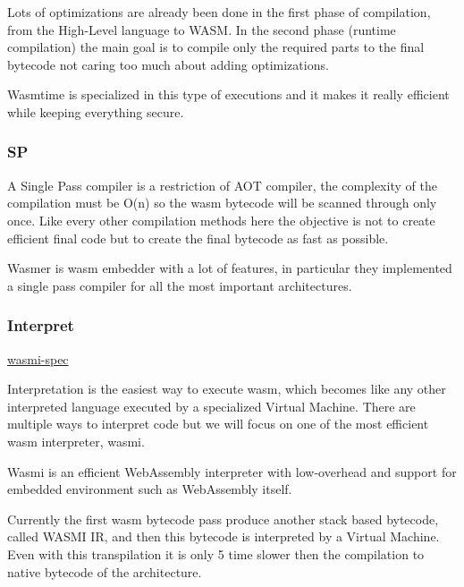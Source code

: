 \documentclass[../main.tex]{subfiles}
\begin{document}
Lots of optimizations are already been done in the first phase of compilation, from the High-Level language to WASM. In the second phase (runtime compilation) the main goal is to compile only the required parts to the final bytecode not caring too much about adding optimizations.


Wasmtime is specialized in this type of executions and it makes it really efficient while keeping everything secure.

\subsubsection{SP} %

A Single Pass compiler is a restriction of AOT compiler, the complexity of the compilation must be O(n) so the wasm bytecode will be scanned through only once. Like every other compilation methods here the objective is not to create efficient final code but to create the final bytecode as fast as possible.

Wasmer is wasm embedder with a lot of features, in particular they implemented a single pass compiler for all the most important architectures.

\subsubsection{Interpret}
\href{https://github.com/paritytech/Wasmi}{wasmi-spec}

Interpretation is the easiest way to execute wasm, which becomes like any other interpreted language executed by a specialized Virtual Machine. There are multiple ways to interpret code but we will focus on one of the most efficient wasm interpreter, wasmi.

Wasmi is an efficient WebAssembly interpreter with low-overhead and support for embedded environment such as WebAssembly itself. ~\cite{wasmi}

Currently the first wasm bytecode pass produce another stack based bytecode, called WASMI IR, and then this bytecode is interpreted by a Virtual Machine. Even with this transpilation it is only 5 time slower then the compilation to native bytecode of the architecture.
\end{document}
